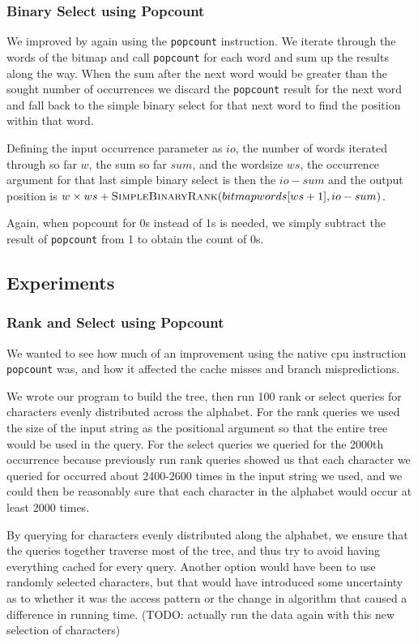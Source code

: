 \subsubsection{Binary Select using Popcount}
\label{sec:ImplBinarySelect}
We improved  by again using the \texttt{popcount} instruction. 
We iterate through the words of the bitmap and call \texttt{popcount} for each word and sum up the results along the way. 
When the sum after the next word would be greater than the sought number of occurrences we discard the \texttt{popcount} result for the next word and fall back to the simple binary select for that next word to find the position within that word.

Defining the input occurrence parameter as $io$, the number of words iterated through so far $w$, the sum so far $sum$, and the wordsize $ws$, the occurrence argument for that last simple binary select is then the $io - sum$ and the output position is $w \times ws + \textproc{SimpleBinaryRank}(bitmapwords[ws+1], io - sum)$.

Again, when popcount for 0s instead of 1s is needed, we simply subtract the result of \texttt{popcount} from 1 to obtain the count of 0s.

\subsection{Experiments}

\subsubsection{Rank and Select using Popcount}
\label{sec:experimentPopcountRankSelect}
We wanted to see how much of an improvement using the native cpu instruction \texttt{popcount} was, and how it affected the cache misses and branch mispredictions.

We wrote our program to build the tree, then run 100 rank or select queries for characters evenly distributed across the alphabet.
For the rank queries we used the size of the input string as the positional argument so that the entire tree would be used in the query.
For the select queries we queried for the 2000th occurrence because previously run rank queries showed us that each character we queried for occurred about 2400-2600 times in the input string we used, and we could then be reasonably sure that each character in the alphabet would occur at least 2000 times.

By querying for characters evenly distributed along the alphabet, we ensure that the queries together traverse most of the tree, and thus try to avoid having everything cached for every query. Another option would have been to use randomly selected characters, but that would have introduced some uncertainty as to whether it was the access pattern or the change in algorithm that caused a difference in running time.
(TODO: actually run the data again with this new selection of characters)

